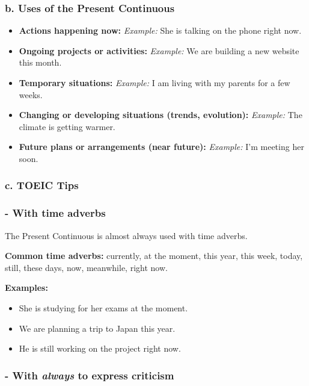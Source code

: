\documentclass[11pt,a4paper]{article}
\begin{document}
\subsubsection*{b. Uses of the Present Continuous}

\begin{itemize}
  \item \textbf{Actions happening now:}  
  \textit{Example:} She is talking on the phone right now.
  \item \textbf{Ongoing projects or activities:}  
  \textit{Example:} We are building a new website this month.
  \item \textbf{Temporary situations:}  
  \textit{Example:} I am living with my parents for a few weeks.
  \item \textbf{Changing or developing situations (trends, evolution):}  
  \textit{Example:} The climate is getting warmer.
  \item \textbf{Future plans or arrangements (near future):}  
  \textit{Example:} I’m meeting her soon.
\end{itemize}

\subsubsection*{c. TOEIC Tips}

\subsubsection*{- With time adverbs}

The Present Continuous is almost always used with time adverbs.

\textbf{Common time adverbs:}  
currently, at the moment, this year, this week, today, still, these days, now, meanwhile, right now.

\textbf{Examples:}
\begin{itemize}
  \item She is studying for her exams at the moment.
  \item We are planning a trip to Japan this year.
  \item He is still working on the project right now.
\end{itemize}

\subsubsection*{- With \textit{always} to express criticism}
\end{document}
